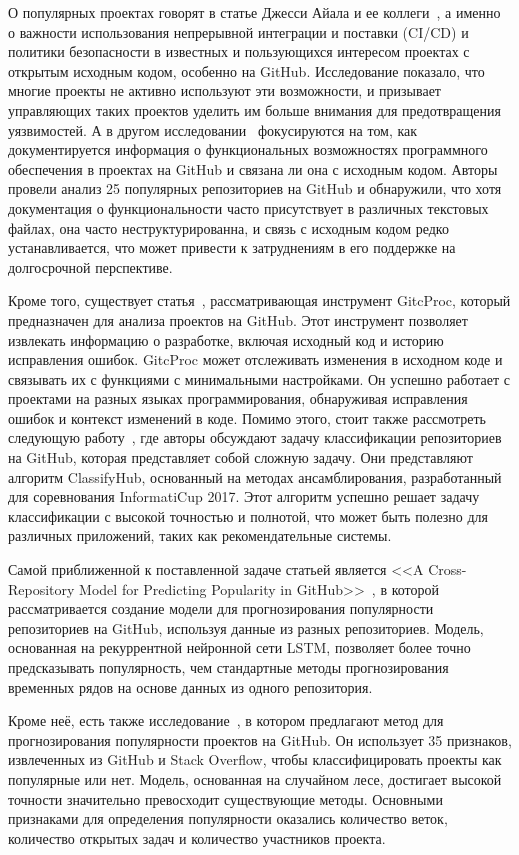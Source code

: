 О популярных проектах говорят в статье Джесси Айала и ее коллеги~\cite{AyalaG23}, а именно о важности использования непрерывной интеграции и поставки (CI/CD) и политики безопасности в известных и пользующихся интересом проектах с открытым исходным кодом, особенно на GitHub. Исследование показало, что многие проекты не активно используют эти возможности, и призывает управляющих таких проектов уделить им больше внимания для предотвращения уязвимостей. А в другом исследовании~\cite{PuhlfurssMM22} фокусируются на том, как документируется информация о функциональных возможностях программного обеспечения в проектах на GitHub и связана ли она с исходным кодом. Авторы провели анализ 25 популярных репозиториев на GitHub и обнаружили, что хотя документация о функциональности часто присутствует в различных текстовых файлах, она часто неструктурированна, и связь с исходным кодом редко устанавливается, что может привести к затруднениям в его поддержке на долгосрочной перспективе. 

Кроме того, существует статья~\cite{CasalnuovoSRR17}, рассматривающая инструмент GitcProc, который предназначен для анализа проектов на GitHub. Этот инструмент позволяет извлекать информацию о разработке, включая исходный код и историю исправления ошибок. GitcProc может отслеживать изменения в исходном коде и связывать их с функциями с минимальными настройками. Он успешно работает с проектами на разных языках программирования, обнаруживая исправления ошибок и контекст изменений в коде. Помимо этого, стоит также рассмотреть следующую работу~\cite{SollV17}, где авторы обсуждают задачу классификации репозиториев на GitHub, которая представляет собой сложную задачу. Они представляют алгоритм ClassifyHub, основанный на методах ансамблирования, разработанный для соревнования InformatiCup 2017. Этот алгоритм успешно решает задачу классификации с высокой точностью и полнотой, что может быть полезно для различных приложений, таких как рекомендательные системы.

Самой приближенной к поставленной задаче статьей является <<A Cross-Repository Model for Predicting Popularity in GitHub>>~\cite{abs-1902-05216}, в которой рассматривается создание модели для прогнозирования популярности репозиториев на GitHub, используя данные из разных репозиториев. Модель, основанная на рекуррентной нейронной сети LSTM, позволяет более точно предсказывать популярность, чем стандартные методы прогнозирования временных рядов на основе данных из одного репозитория. 

Кроме неё, есть также исследование~\cite{HanDXWY19}, в котором предлагают метод для прогнозирования популярности проектов на GitHub. Он использует 35 признаков, извлеченных из GitHub и Stack Overflow, чтобы классифицировать проекты как популярные или нет. Модель, основанная на случайном лесе, достигает высокой точности значительно превосходит существующие методы. Основными признаками для определения популярности оказались количество веток, количество открытых задач и количество участников проекта.